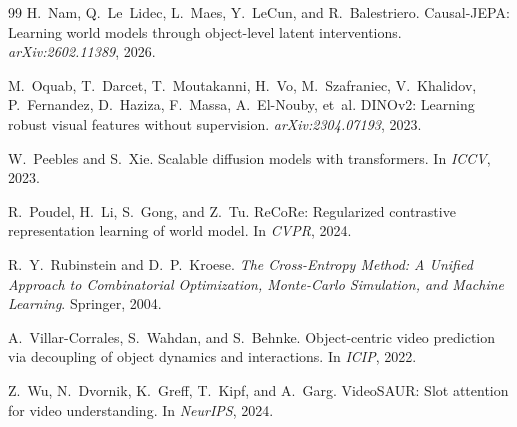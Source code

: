 \documentclass[12pt]{article}
\begin{document}
\begin{thebibliography}{99}
H.~Nam, Q.~Le~Lidec, L.~Maes, Y.~LeCun, and R.~Balestriero.
\newblock Causal-JEPA: Learning world models through object-level latent interventions.
\newblock \textit{arXiv:2602.11389}, 2026.

M.~Oquab, T.~Darcet, T.~Moutakanni, H.~Vo, M.~Szafraniec, V.~Khalidov, P.~Fernandez, D.~Haziza, F.~Massa, A.~El-Nouby, et~al.
\newblock DINOv2: Learning robust visual features without supervision.
\newblock \textit{arXiv:2304.07193}, 2023.

W.~Peebles and S.~Xie.
\newblock Scalable diffusion models with transformers.
\newblock In \textit{ICCV}, 2023.

R.~Poudel, H.~Li, S.~Gong, and Z.~Tu.
\newblock ReCoRe: Regularized contrastive representation learning of world model.
\newblock In \textit{CVPR}, 2024.

R.~Y.~Rubinstein and D.~P.~Kroese.
\newblock \textit{The Cross-Entropy Method: A Unified Approach to Combinatorial Optimization, Monte-Carlo Simulation, and Machine Learning}.
\newblock Springer, 2004.

A.~Villar-Corrales, S.~Wahdan, and S.~Behnke.
\newblock Object-centric video prediction via decoupling of object dynamics and interactions.
\newblock In \textit{ICIP}, 2022.

Z.~Wu, N.~Dvornik, K.~Greff, T.~Kipf, and A.~Garg.
\newblock VideoSAUR: Slot attention for video understanding.
\newblock In \textit{NeurIPS}, 2024.

\end{thebibliography}
\end{document}
